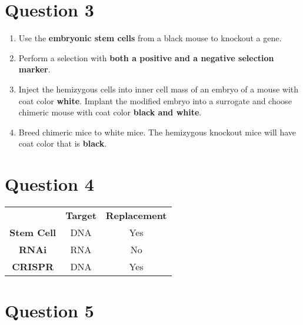 \documentclass{article}
\begin{document}
\section*{Question 3}

\begin{enumerate}
    \item Use the \textbf{embryonic stem cells} from a black mouse to knockout a
        gene.
    
    \item Perform a selection with \textbf{both a positive and a negative
        selection marker}.
    
    \item Inject the hemizygous cells into inner cell mass of an embryo of a
        mouse with coat color \textbf{white}. Implant the modified embryo into a
        surrogate and choose chimeric mouse with coat color \textbf{black and
        white}.
    
    \item Breed chimeric mice to white mice. The hemizygous knockout mice will
        have coat color that is \textbf{black}.
\end{enumerate}

\section*{Question 4}

\begin{center}
    \begin{tabular}{c c c}
        & \textbf{Target} & \textbf{Replacement} \\
        \textbf{Stem Cell} & DNA & Yes \\
        \textbf{RNAi} & RNA & No\\
        \textbf{CRISPR} & DNA & Yes
    \end{tabular}
\end{center}

\section*{Question 5}
\end{document}
